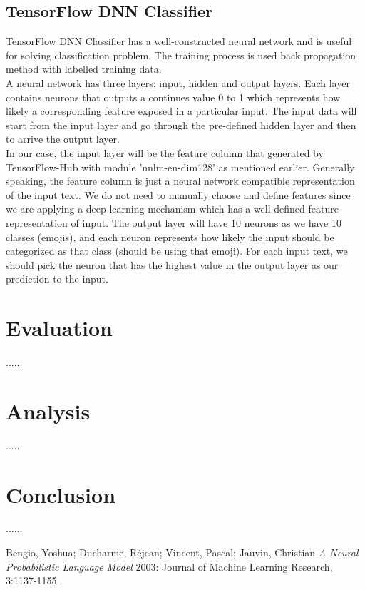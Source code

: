 \documentclass[12pt]{article}
\begin{document}
\subsection{TensorFlow DNN Classifier}

TensorFlow DNN Classifier has a well-constructed neural network and is useful for solving classification problem. The training process is used back propagation method with labelled training data.
\medskip \\
A neural network has three layers: input, hidden and output layers. Each layer contains neurons that outputs a continues value 0 to 1 which represents how likely a corresponding feature exposed in a particular input. The input data will start from the input layer and go through the pre-defined hidden layer and then to arrive the output layer.
\medskip \\
In our case, the input layer will be the feature column that generated by TensorFlow-Hub with module 'nnlm-en-dim128' as mentioned earlier. Generally speaking, the feature column is just a neural network compatible representation of the input text. We do not need to manually choose and define features since we are applying a deep learning mechanism which has a well-defined feature representation of input. The output layer will have 10 neurons as we have 10 classes (emojis), and each neuron represents how likely the input should be categorized as that class (should be using that emoji). For each input text, we should pick the neuron that has the highest value in the output layer as our prediction to the input.

\section{Evaluation}
......

\section{Analysis}
......

\section{Conclusion}
......


\begin{thebibliography}{99}

 Bengio, Yoshua; Ducharme, Réjean; Vincent, Pascal; Jauvin, Christian {\em A Neural Probabilistic Language Model} 2003: Journal of Machine Learning Research, 3:1137-1155.

\end{thebibliography}
  
\end{document}
